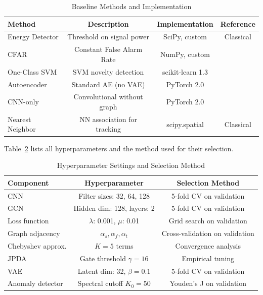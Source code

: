 \documentclass[sensors,article,submit,pdftex]{mdpi}
\begin{document}
\begin{table}[H]
    \centering
    \caption{Baseline Methods and Implementation}
    \label{tab:baselines}
    \small
    \begin{tabular}{@{}lccc@{}}
        \toprule
        \textbf{Method} & \textbf{Description} & \textbf{Implementation} & \textbf{Reference} \\
        \midrule
        Energy Detector & Threshold on signal power & SciPy, custom & Classical \\
        CFAR & Constant False Alarm Rate & NumPy, custom & \cite{barshalom2011} \\
        One-Class SVM & SVM novelty detection & scikit-learn 1.3 & \cite{rajendran2018} \\
        Autoencoder & Standard AE (no VAE) & PyTorch 2.0 & \cite{oshea2016} \\
        CNN-only & Convolutional without graph & PyTorch 2.0 & \cite{oshea2016} \\
        Nearest Neighbor & NN association for tracking & scipy.spatial & Classical \\
        \bottomrule
    \end{tabular}
\end{table}

Table~\ref{tab:hyperparams} lists all hyperparameters and the method used for their selection.

\begin{table}[H]
    \centering
    \caption{Hyperparameter Settings and Selection Method}
    \label{tab:hyperparams}
    \small
    \begin{tabular}{@{}lcc@{}}
        \toprule
        \textbf{Component} & \textbf{Hyperparameter} & \textbf{Selection Method} \\
        \midrule
        CNN & Filter sizes: 32, 64, 128 & 5-fold CV on validation \\
        GCN & Hidden dim: 128, layers: 2 & 5-fold CV on validation \\
        Loss function & $\lambda$: 0.001, $\mu$: 0.01 & Grid search on validation \\
        Graph adjacency & $\alpha_s, \alpha_f, \alpha_t$ & Cross-validation on validation \\
        Chebyshev approx. & $K = 5$ terms & Convergence analysis \\
        JPDA & Gate threshold $\gamma = 16$ & Empirical tuning \\
        VAE & Latent dim: 32, $\beta = 0.1$ & 5-fold CV on validation \\
        Anomaly detector & Spectral cutoff $K_0 = 50$ & Youden's J on validation \\
        \bottomrule
    \end{tabular}
\end{table}
\end{document}
